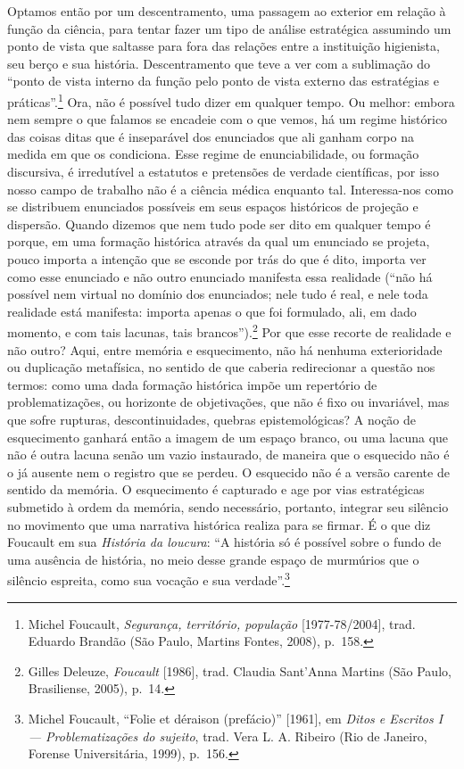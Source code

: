 Optamos então por um descentramento, uma passagem ao exterior em relação
à função da ciência, para tentar fazer um tipo de análise estratégica
assumindo um ponto de vista que saltasse para fora das relações entre a
instituição higienista, seu berço e sua história. Descentramento que
teve a ver com a sublimação do ``ponto de vista interno da função pelo
ponto de vista externo das estratégias e práticas''.\footnote{Michel
  Foucault, \textit{Segurança, território, população} {[}1977-78/2004{]},
  trad. Eduardo Brandão (São Paulo, Martins Fontes, 2008), p.~158.} Ora,
não é possível tudo dizer em qualquer tempo. Ou melhor: embora nem
sempre o que falamos se encadeie com o que vemos, há um regime histórico
das coisas ditas que é inseparável dos enunciados que ali ganham corpo
na medida em que os condiciona. Esse regime de enunciabilidade, ou
formação discursiva, é irredutível a estatutos e pretensões de verdade
científicas, por isso nosso campo de trabalho não é a ciência médica
enquanto tal. Interessa-nos como se distribuem enunciados possíveis em
seus espaços históricos de projeção e dispersão. Quando dizemos que nem
tudo pode ser dito em qualquer tempo é porque, em uma formação histórica
através da qual um enunciado se projeta, pouco importa a intenção que se
esconde por trás do que é dito, importa ver como esse enunciado e não
outro enunciado manifesta essa realidade (``não há possível nem virtual
no domínio dos enunciados; nele tudo é real, e nele toda realidade está
manifesta: importa apenas o que foi formulado, ali, em dado momento, e
com tais lacunas, tais brancos'').\footnote{Gilles Deleuze,
  \textit{Foucault} {[}1986{]}, trad. Claudia Sant'Anna Martins (São
  Paulo, Brasiliense, 2005), p.~14.} Por que esse recorte de realidade e
não outro? Aqui, entre memória e esquecimento, não há nenhuma
exterioridade ou duplicação metafísica, no sentido de que caberia
redirecionar a questão nos termos: como uma dada formação histórica
impõe um repertório de problematizações, ou horizonte de objetivações,
que não é fixo ou invariável, mas que sofre rupturas, descontinuidades,
quebras epistemológicas? A noção de esquecimento ganhará então a imagem
de um espaço branco, ou uma lacuna que não é outra lacuna senão um vazio
instaurado, de maneira que o esquecido não é o já ausente nem o registro
que se perdeu. O esquecido não é a versão carente de sentido da memória.
O esquecimento é capturado e age por vias estratégicas submetido à ordem
da memória, sendo necessário, portanto, integrar seu silêncio no
movimento que uma narrativa histórica realiza para se firmar. É o que
diz Foucault em sua \textit{História da loucura}: ``A história só é
possível sobre o fundo de uma ausência de história, no meio desse grande
espaço de murmúrios que o silêncio espreita, como sua vocação e sua
verdade''.\footnote{Michel Foucault, ``Folie et déraison (prefácio)''
  {[}1961{]}, em \textit{Ditos e Escritos I --- Problematizações do
  sujeito}, trad. Vera L. A. Ribeiro (Rio de Janeiro, Forense
  Universitária, 1999), p.~156.}


